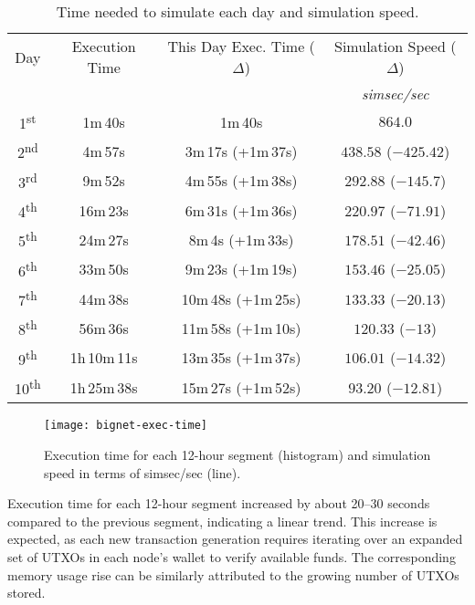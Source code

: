 \begin{table}[tbhp]
	\centering
	\begin{tabular}{|c|c|c|c|}
		\toprule
		Day & Execution Time & This Day Exec\@. Time (\(\Delta\)) & Simulation Speed (\(\Delta\)) \\
		& & & \textit{\small simsec/sec} \\
		\midrule
		1\textsuperscript{st} & 1m\,40s & 1m\,40s & \(864.0\) \\[6pt]
		2\textsuperscript{nd} & 4m\,57s & 3m\,17s (+1m\,37s) & \(438.58\) (\(-425.42\)) \\[6pt]
		3\textsuperscript{rd} & 9m\,52s & 4m\,55s (+1m\,38s) & \(292.88\) (\(-145.7\)) \\[6pt]
		4\textsuperscript{th} & 16m\,23s & 6m\,31s (+1m\,36s) & \(220.97\) (\(-71.91\)) \\[6pt]
		5\textsuperscript{th} & 24m\,27s & 8m\,4s (+1m\,33s) & \(178.51\) (\(-42.46\)) \\[6pt]
		6\textsuperscript{th} & 33m\,50s & 9m\,23s (+1m\,19s) & \(153.46\) (\(-25.05\)) \\[6pt]
		7\textsuperscript{th} & 44m\,38s & 10m\,48s (+1m\,25s) & \(133.33\) (\(-20.13\)) \\[6pt]
		8\textsuperscript{th} & 56m\,36s & 11m\,58s (+1m\,10s) & \(120.33\) (\(-13\)) \\[6pt]
		9\textsuperscript{th} & 1h\,10m\,11s & 13m\,35s (+1m\,37s) & \(106.01\) (\(-14.32\)) \\[6pt]
		10\textsuperscript{th} & 1h\,25m\,38s & 15m\,27s (+1m\,52s) & \(93.20\) (\(-12.81\)) \\
		\bottomrule
	\end{tabular}
	\caption{Time needed to simulate each day and simulation speed.}\label{tab:bnp-performance}
\end{table}

\begin{figure}[tbhp]
	\centering
	\texttt{[image: bignet-exec-time]}
	\caption{Execution time for each 12-hour segment (histogram) and
	simulation speed in terms of simsec/sec
	(line).}\label{fig:bnp-execution-time}
\end{figure}

Execution time for each 12-hour segment increased by about 20--30 seconds
compared to the previous segment, indicating a linear trend. This increase is
expected, as each new transaction generation requires iterating over an
expanded set of UTXOs in each node's wallet to verify available funds. The
corresponding memory usage rise can be similarly attributed to the growing
number of UTXOs stored.

